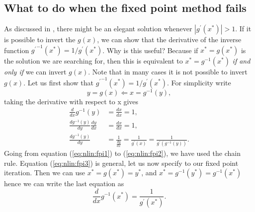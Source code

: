 \documentclass[graybox,sectrefs,envcountresetchap,open=right,final]{svmonodo}
\begin{document}
\subsection{What to do when the fixed point method fails}
As discussed in \cite{newman2013}, there might be an elegant solution whenever $|g^\prime(x^*)|>1$. If it is possible to invert the $g(x)$, we can show that the derivative of the inverse function
$ { g^\prime }^{-1} (x^*)  = 1/g^\prime (x^*) $. Why is this useful? Because if $x^*=g(x^*)$ is the solution we are searching for, then this is equivalent to $x^*={g}^{-1}(x^*)$ \emph{if and only if} we can invert $g(x)$. Note that in many cases it is not possible to invert $g(x)$. Let us first show that $ { g^\prime }^{-1} (x^*)  = 1/g^\prime (x^*) $. For simplicity write
\begin{equation}
y = g(x)\Leftarrow x=g^{-1}(y),
\end{equation}
taking the derivative with respect to x gives
\begin{align}
\frac{d}{dx}g^{-1}(y)&=\frac{dx}{dx}=1,\label{eq:nlin:fpi1}\\ 
\frac{dg^{-1}(y)}{dy}\frac{dy}{dx}&=\frac{dx}{dx}=1,\label{eq:nlin:fpi2}\\ 
\frac{dg^{-1}(y)}{dy}&=\frac{1}{\frac{dy}{dx}}=\frac{1}{g^{\prime}(x)}
=\frac{1}{g^{\prime}(g^{-1}(y))}.\label{eq:nlin:fpi3}
\end{align}
Going from equation (\ref{eq:nlin:fpi1}) to (\ref{eq:nlin:fpi2}), we have used the chain rule. Equation (\ref{eq:nlin:fpi3}) is general, let us now specify to our fixed point iteration. Then we can use $x^*=g(x^*)=y^*$, and $x^*=g^{-1}(y^*)=g^{-1}(x^*)$ hence we can write the last equation as
\begin{equation}
\frac{d}{dx}g^{-1}(x^*)=\frac{1}{g^{\prime}(x^*)}.
\label{eq:nlin:fpif}
\end{equation}
\end{document}
